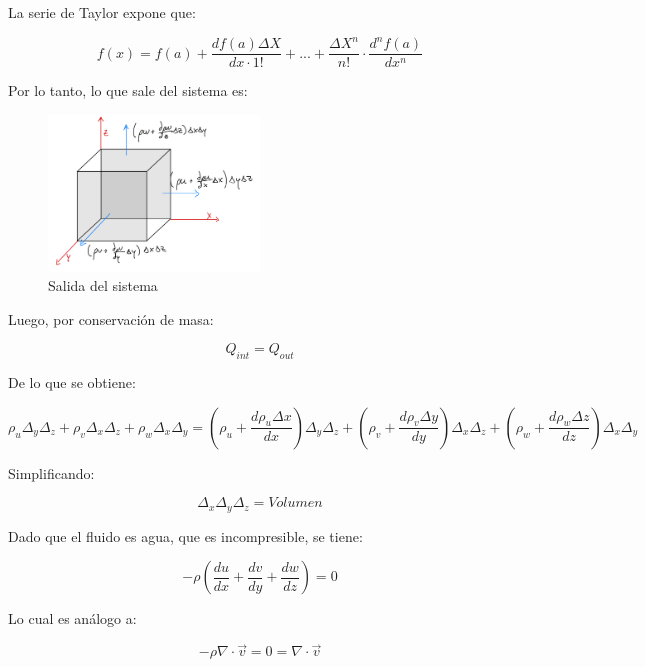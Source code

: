 La serie de Taylor expone que:

\begin{equation}
    f(x) = f(a) + \frac{df(a) \Delta X}{dx \cdot 1!} + ... + \frac{\Delta X^n}{n!} \cdot \frac{d^n f(a)}{dx^n}
\end{equation}

Por lo tanto, lo que sale del sistema es:

\begin{figure}[H]
    \centering
    \includegraphics[width=0.5\textwidth]{FOTOS/out.jpg}
    \caption{Salida del sistema}
    \label{fig:ley_darcy_out}
\end{figure}

Luego, por conservación de masa:

\begin{equation}
    Q_{int} = Q_{out}
\end{equation}

De lo que se obtiene:

\begin{equation}
    \rho_u \Delta_y \Delta_z + \rho_v \Delta_x \Delta_z + \rho_w \Delta_x \Delta_y = (\rho_u + \frac{d\rho_u \Delta x}{dx})\Delta_y \Delta_z + (\rho_v + \frac{d\rho_v \Delta y}{dy})\Delta_x \Delta_z + (\rho_w + \frac{d\rho_w \Delta z}{dz})\Delta_x \Delta_y
\end{equation}

Simplificando:

\begin{equation}
    \Delta_x \Delta_y \Delta_z = Volumen
\end{equation}

Dado que el fluido es agua, que es incompresible, se tiene:

\begin{equation}
   -\rho(\frac{du}{dx}+ \frac{dv}{dy}+ \frac{dw}{dz}) = 0
\end{equation}

Lo cual es análogo a:

\begin{equation}
    -\rho \nabla \cdot \vec{v} = 0 = \nabla \cdot \vec{v}
\end{equation}

